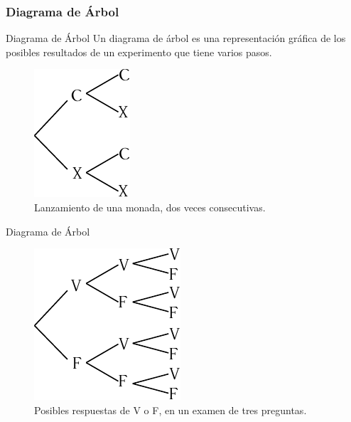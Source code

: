 \documentclass[11pt]{beamer}
\begin{document}
        \subsubsection*{Diagrama de Árbol}
          \begin{frame}{Diagrama de Árbol}
            Un diagrama de árbol es una representación gráfica de los posibles resultados de un experimento que tiene varios pasos.
            \begin{figure}
                \centering
                \includegraphics[width=0.3\linewidth]{images/estadistica6}
                \caption{Lanzamiento de una monada, dos veces consecutivas.}
                \label{fig:estadistica6}
            \end{figure}

          \end{frame}
          \begin{frame}{Diagrama de Árbol}
              \begin{figure}
                  \centering
                  \includegraphics[width=0.3\linewidth]{images/estadistica7}
                  \caption{Posibles respuestas  de V o F, en un examen de tres preguntas.}
                  \label{fig:estadistica7}
              \end{figure}

          \end{frame}
\end{document}

